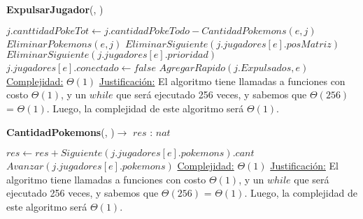 \begin{algorithm}[H]{\textbf{ExpulsarJugador}(, )}   
    \begin{algorithmic}[1]
        \State $j.canttidadPokeTot \gets j.cantidadPokeTodo - CantidadPokemons(e,j)$
        \State $EliminarPokemons(e,j)$
        \State $EliminarSiguiente(j.jugadores[e].posMatriz)$
            \State $EliminarSiguiente(j.jugadores[e].prioridad)$
        \EndIf
        \State $j.jugadores[e].conectado \gets false$
        \State $AgregarRapido(j.Expulsados, e)$
        \medskip
        \Statex \underline{Complejidad:} $\Theta(1)$
        \Statex \underline{Justificación:}  El algoritmo tiene llamadas a funciones con costo $\Theta(1)$, y un $while$ que será ejecutado 256 veces, y sabemos que $\Theta (256)$ = $\Theta (1)$. Luego, la complejidad de este algoritmo será $\Theta (1)$.
    \end{algorithmic}
\end{algorithm} 

\begin{algorithm}[H]{\textbf{CantidadPokemons}(, )$\to$ $res$ : $nat$}   
    \begin{algorithmic}[1]
            \State $res \gets res + Siguiente(j.jugadores[e].pokemons).cant$
            \State $Avanzar(j.jugadores[e].pokemons)$
        \EndWhile
        \medskip
        \Statex \underline{Complejidad:} $\Theta(1)$
        \Statex \underline{Justificación:}  El algoritmo tiene llamadas a funciones con costo $\Theta(1)$, y un $while$ que será ejecutado 256 veces, y sabemos que $\Theta (256)$ = $\Theta (1)$. Luego, la complejidad de este algoritmo será $\Theta (1)$.
    \end{algorithmic}
\end{algorithm} 

